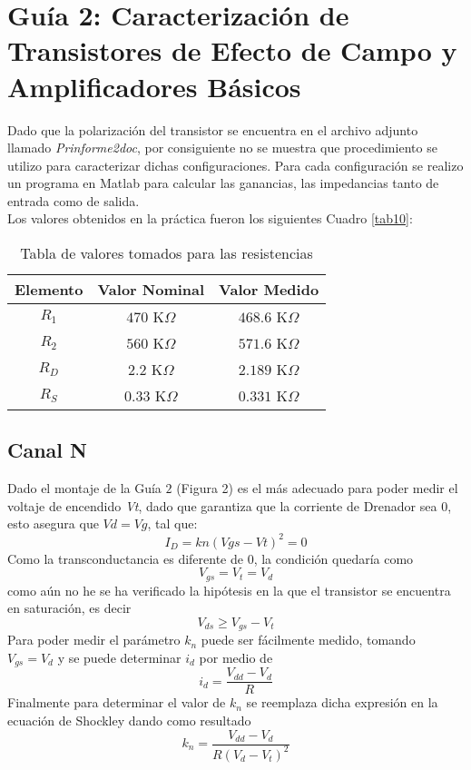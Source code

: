 \documentclass[11pt,graphicx,caption,rotating]{article}
\begin{document}
\section{Guía 2: Caracterización de Transistores de Efecto de Campo y Amplificadores Básicos}
\noindent
Dado que la polarización del transistor se encuentra en el archivo adjunto llamado \textit{Prinforme2doc}, por consiguiente no se muestra que procedimiento se utilizo para caracterizar dichas configuraciones. Para cada configuración se realizo un programa en Matlab para calcular las ganancias, las impedancias tanto de entrada como de salida.\\
Los valores obtenidos en la práctica fueron los siguientes Cuadro \ref{tab10}:

\begin{table}[H]
	\centering
\begin{tabular}[c]{|c||c|c|} \hline
Elemento & Valor Nominal & Valor Medido \\ \hline
$R_1$ & $470$ K$\Omega$ & $468.6$ K$\Omega$ \\ \hline
$R_2$ & $560$ K$\Omega$ & $571.6$ K$\Omega$ \\ \hline
$R_D$ & $2.2$ K$\Omega$ & $2.189$ K$\Omega$ \\ \hline
$R_S$ & $0.33$ K$\Omega$ & $0.331$ K$\Omega$ \\ \hline
\end{tabular}
	\caption{Tabla de valores tomados para las resistencias}
	\label{tab7}
\end{table}

\subsection{Canal N}
\noindent
Dado el montaje de la Guía $2$ (Figura 2) es el más adecuado para poder medir el voltaje de encendido \textit{Vt}, dado que garantiza que la corriente de Drenador sea $0$, esto asegura que $Vd=Vg$, tal que:
\begin{equation}
 I_{D}=kn (Vgs-Vt)^{2}=0
\label{ecu1}
\end{equation}
\noindent
Como la transconductancia es diferente de $0$, la condición quedaría como
\begin{equation}
 V_{gs}=V_t=V_d
\label{ecu2}
\end{equation}
\noindent
como aún no he se ha verificado la hipótesis en la que el transistor se encuentra en saturación, es decir
\begin{equation}
 V_{ds} \geq V_{gs}-V_t
\label{ecu3}
\end{equation}
\noindent
Para poder medir el parámetro $k_n$ puede ser fácilmente medido, tomando $V_{gs}=V_d$ y se puede determinar $i_d$ por medio de
\begin{equation}
 i_d=\frac{V_{dd}-V_d}{R}
\label{ecu4}
\end{equation}
\noindent
Finalmente para determinar el valor de $k_n$ se reemplaza dicha expresión en la ecuación de Shockley dando como resultado
\begin{equation}
 k_n=\frac{V_{dd}-V_d}{R(V_d-V_t)^{2}}
\end{equation}
\end{document}
